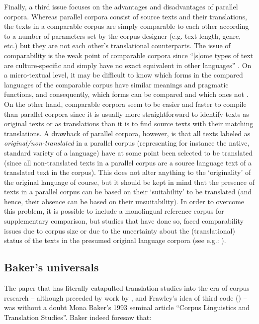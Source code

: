 Finally, a third issue focuses on the advantages and disadvantages of parallel corpora. Whereas parallel corpora consist of source texts and their translations, the texts in a comparable corpus are simply comparable to each other according to a number of parameters set by the corpus designer (e.g. text length, genre, etc.) but they are not each other’s translational counterparts. The issue of comparability is the weak point of comparable corpora since “[s]ome types of text are culture-specific and simply have no exact equivalent in other languages” \citep[19]{granger_corpus_2003}. On a micro-textual level, it may be difficult to know which forms in the compared languages of the comparable corpus have similar meanings and pragmatic functions, and consequently, which forms can be compared and which ones not \citep[5]{johansson_translational_1998}. On the other hand, comparable corpora seem to be easier and faster to compile than parallel corpora since it is usually more straightforward to identify texts as original texts or as translations than it is to find source texts with their matching translations. A drawback of parallel corpora, however, is that all texts labeled as \textit{original/non-translated} in a parallel corpus (representing for instance the native, standard variety of a language) have at some point been selected to be translated (since all non-translated texts in a parallel corpus are a source language text of a translated text in the corpus). This does not alter anything to the ‘originality’ of the original language of course, but it should be kept in mind that the presence of texts in a parallel corpus can be based on their ‘suitability’ to be translated (and hence, their absence can be based on their unsuitability). In order to overcome this problem, it is possible to include a monolingual reference corpus for supplementary comparison, but studies that have done so, faced comparability issues due to corpus size or due to the uncertainty about the (translational) status of the texts in the presumed original language corpora (see e.g.: \citealt{musolff_conceptual_2014}).


\subsection{\label{sec:2.2.2}  Baker’s universals}
\hypertarget{Bakersuniversals}{}
The paper that has literally catapulted translation studies into the era of corpus research – although preceded by work by \citet{toury_search_1980}, \citet{wollin_translationese_1986} and Frawley’s idea of third code (\citealt{frawley_translation:_1984}) – was without a doubt Mona Baker’s 1993 seminal article “Corpus Linguistics and Translation Studies”. Baker indeed foresaw that:


